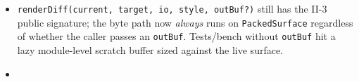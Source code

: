 \begin{itemize}
  The \texttt{s\allowbreak{}g\allowbreak{}r\allowbreak{}C\allowbreak{}a\allowbreak{}c\allowbreak{}h\allowbreak{}e} / \texttt{s\allowbreak{}t\allowbreak{}y\allowbreak{}l\allowbreak{}e\allowbreak{}C\allowbreak{}a\allowbreak{}c\allowbreak{}h\allowbreak{}e\allowbreak{}K\allowbreak{}e\allowbreak{}y} / \texttt{b\allowbreak{}u\allowbreak{}i\allowbreak{}l\allowbreak{}d\allowbreak{}S\allowbreak{}g\allowbreak{}r} / \texttt{e\allowbreak{}m\allowbreak{}i\allowbreak{}t\allowbreak{}S\allowbreak{}g\allowbreak{}r\allowbreak{}F\allowbreak{}r\allowbreak{}o\allowbreak{}m\allowbreak{}B\allowbreak{}u\allowbreak{}f} string-cache layer is gone. So are the \texttt{F\allowbreak{}L\allowbreak{}A\allowbreak{}G\allowbreak{}\_\allowbreak{}S\allowbreak{}G\allowbreak{}R} / \texttt{U\allowbreak{}N\allowbreak{}D\allowbreak{}E\allowbreak{}R\allowbreak{}L\allowbreak{}I\allowbreak{}N\allowbreak{}E\allowbreak{}\_\allowbreak{}S\allowbreak{}G\allowbreak{}R} / \texttt{D\allowbreak{}A\allowbreak{}S\allowbreak{}H\allowbreak{}E\allowbreak{}D\allowbreak{}\_\allowbreak{}S\allowbreak{}G\allowbreak{}R} / \texttt{R\allowbreak{}E\allowbreak{}S\allowbreak{}E\allowbreak{}T\allowbreak{}\_\allowbreak{}S\allowbreak{}G\allowbreak{}R} string constants used only by \texttt{b\allowbreak{}u\allowbreak{}i\allowbreak{}l\allowbreak{}d\allowbreak{}S\allowbreak{}g\allowbreak{}r}.
\item
  \texttt{r\allowbreak{}e\allowbreak{}n\allowbreak{}d\allowbreak{}e\allowbreak{}r\allowbreak{}D\allowbreak{}i\allowbreak{}f\allowbreak{}f\allowbreak{}(\allowbreak{}c\allowbreak{}u\allowbreak{}r\allowbreak{}r\allowbreak{}e\allowbreak{}n\allowbreak{}t\allowbreak{},\allowbreak{} \allowbreak{}t\allowbreak{}a\allowbreak{}r\allowbreak{}g\allowbreak{}e\allowbreak{}t\allowbreak{},\allowbreak{} \allowbreak{}i\allowbreak{}o\allowbreak{},\allowbreak{} \allowbreak{}s\allowbreak{}t\allowbreak{}y\allowbreak{}l\allowbreak{}e\allowbreak{},\allowbreak{} \allowbreak{}o\allowbreak{}u\allowbreak{}t\allowbreak{}B\allowbreak{}u\allowbreak{}f\allowbreak{}?\allowbreak{})} still has the II-3 public signature; the byte path now \emph{always} runs on \texttt{P\allowbreak{}a\allowbreak{}c\allowbreak{}k\allowbreak{}e\allowbreak{}d\allowbreak{}S\allowbreak{}u\allowbreak{}r\allowbreak{}f\allowbreak{}a\allowbreak{}c\allowbreak{}e} regardless of whether the caller passes an \texttt{o\allowbreak{}u\allowbreak{}t\allowbreak{}B\allowbreak{}u\allowbreak{}f}. Tests/bench without \texttt{o\allowbreak{}u\allowbreak{}t\allowbreak{}B\allowbreak{}u\allowbreak{}f} hit a lazy module-level scratch buffer sized against the live surface.
\item

\end{itemize}
